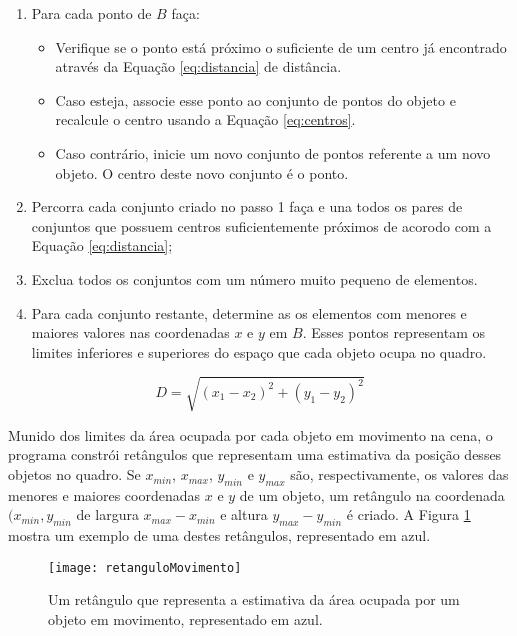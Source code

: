 \begin{enumerate}
\item Para cada ponto de $B$ faça: 
	\begin{itemize}
		\item Verifique se o ponto está próximo o suficiente de um centro já 				encontrado através da Equação \ref{eq:distancia} de distância.
		\item Caso esteja, associe esse ponto ao conjunto de pontos do objeto e 			recalcule o centro usando a Equação \ref{eq:centros}. 
		\item Caso contrário, inicie um novo conjunto de pontos referente a um 				novo objeto. O centro deste novo conjunto é o ponto.
	\end{itemize}

\item Percorra cada conjunto criado no passo 1 faça e una todos os pares de conjuntos que possuem centros suficientemente próximos de acorodo com a Equação \ref{eq:distancia};

\item Exclua todos os conjuntos com um número muito pequeno de elementos.

\item Para cada conjunto restante, determine as os elementos com menores e maiores valores nas coordenadas $x$ e $y$ em $B$. Esses pontos representam os limites inferiores e superiores do espaço que cada objeto ocupa no quadro.
\end{enumerate}

\begin{equation}
D = \sqrt{(x_1-x_2)^2+(y_1-y_2)^2}
\label{eq:distancia}
\end{equation}

Munido dos limites da área ocupada por cada objeto em movimento na cena, o programa constrói retângulos que representam uma estimativa da posição desses objetos no quadro. Se $x_{min}$, $x_{max}$, $y_{min}$ e $y_{max}$ são, respectivamente, os valores das menores e maiores coordenadas $x$ e $y$ de um objeto, um retângulo na coordenada $(x_{min},y_{min}$ de largura $x_{max}-x_{min}$ e altura $y_{max}-y_{min}$ é criado. A Figura \ref{fig:retanguloMovimento} mostra um exemplo de uma destes retângulos, representado em azul.

\begin{figure}
\centering
\texttt{[image: retanguloMovimento]}
\centering
\caption{Um retângulo que representa a estimativa da área ocupada por um objeto em movimento, representado em azul.}
\label{fig:retanguloMovimento}
\end{figure}

